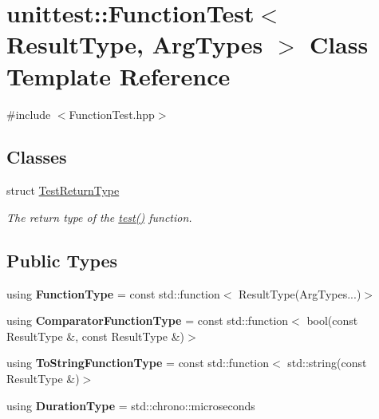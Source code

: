 \hypertarget{classunittest_1_1_function_test}{}\section{unittest\+:\+:Function\+Test$<$ Result\+Type, Arg\+Types $>$ Class Template Reference}
\label{classunittest_1_1_function_test}


{\ttfamily \#include $<$Function\+Test.\+hpp$>$}

\subsection*{Classes}
\begin{DoxyCompactItemize}
\item 
struct \hyperlink{structunittest_1_1_function_test_1_1_test_return_type}{Test\+Return\+Type}
\begin{DoxyCompactList}\small\item\em The return type of the \hyperlink{classunittest_1_1_function_test_a25ae63b50e7339b313ed11e0ba1e02dc}{test()} function. \end{DoxyCompactList}\end{DoxyCompactItemize}
\subsection*{Public Types}
\begin{DoxyCompactItemize}
\item 
using {\bfseries Function\+Type} = const std\+::function$<$ Result\+Type(Arg\+Types...)$>$\hypertarget{classunittest_1_1_function_test_a1e71709c1e6f21e812d11a69894c4b64}{}\label{classunittest_1_1_function_test_a1e71709c1e6f21e812d11a69894c4b64}

\item 
using {\bfseries Comparator\+Function\+Type} = const std\+::function$<$ bool(const Result\+Type \&, const Result\+Type \&)$>$\hypertarget{classunittest_1_1_function_test_ac60bbd8d8089864b1ac087ce0e092721}{}\label{classunittest_1_1_function_test_ac60bbd8d8089864b1ac087ce0e092721}

\item 
using {\bfseries To\+String\+Function\+Type} = const std\+::function$<$ std\+::string(const Result\+Type \&)$>$\hypertarget{classunittest_1_1_function_test_aa4fbe91c7839a2485e9b73cdf630be43}{}\label{classunittest_1_1_function_test_aa4fbe91c7839a2485e9b73cdf630be43}

\item 
using {\bfseries Duration\+Type} = std\+::chrono\+::microseconds\hypertarget{classunittest_1_1_function_test_a08c94f024a60e168319401cf79538919}{}\label{classunittest_1_1_function_test_a08c94f024a60e168319401cf79538919}

\end{DoxyCompactItemize}
